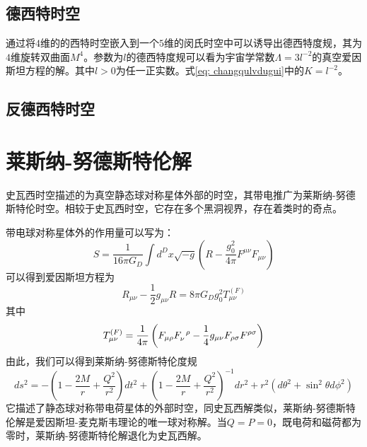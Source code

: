 \subsection{德西特时空}
通过将$4$维的的西特时空嵌入到一个$5$维的闵氏时空中可以诱导出德西特度规，其为$4$维旋转双曲面$M^4$。参数为$l$的德西特度规可以看为宇宙学常数$\Lambda=3l^{-2}$的真空爱因斯坦方程的解。其中$l>0$为任一正实数。式\eqref{eq: changqulvdugui}中的$K=l^{-2}$。
\subsection{反德西特时空}
\section{莱斯纳-努德斯特伦解}
史瓦西时空描述的为真空静态球对称星体外部的时空，其带电推广为莱斯纳-努德斯特伦时空。相较于史瓦西时空，它存在多个黑洞视界，存在着类时的奇点。

带电球对称星体外的作用量可以写为：
\begin{equation}
    S=\frac{1}{16 \pi G_D}\int d^D x \sqrt{-g}\left(R-\frac{g_{0}^2}{4 \pi}F^{\mu \nu}F_{\mu \nu}\right)
\end{equation}
可以得到爱因斯坦方程为
\begin{equation}
    R_{\mu \nu}-\frac{1}{2}g_{\mu \nu}R=8\pi G_D g_0^2 T^{\left(F\right)}_{\mu \nu}
\end{equation}
其中
\begin{equation}
    T^{\left(F\right)}_{\mu \nu}=\frac{1}{4\pi}\left(F_{\mu \rho }F\indices{_{\nu}^{\rho}}-\frac{1}{4}g_{\mu \nu}F_{\rho \sigma}F^{\rho \sigma} \right)
\end{equation}
由此，我们可以得到莱斯纳-努德斯特伦度规\citep{陈斌2018广义相对论}
\begin{equation}\label{eq: RNmetric}
     ds^2=-\left(1-\frac{2M}{r}+\frac{Q^2}{r^2}\right)dt^2+\left(1-\frac{2M}{r}+\frac{Q^2}{r^2}\right)^{-1}dr^2+r^2\left(d\theta^2+\sin ^2 \theta d\phi^2\right)
\end{equation}
它描述了静态球对称带电荷星体的外部时空，同史瓦西解类似，莱斯纳-努德斯特伦解是爱因斯坦-麦克斯韦理论的唯一球对称解。当$Q=P=0$，既电荷和磁荷都为零时，莱斯纳-努德斯特伦解退化为史瓦西解。

